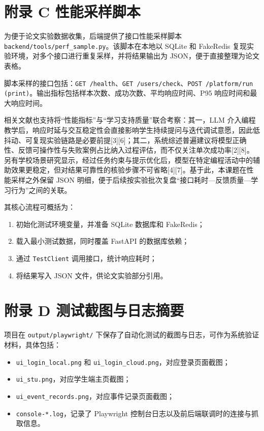 \section{附录 C 性能采样脚本}\label{ux9644ux5f55-c-ux6027ux80fdux91c7ux6837ux811aux672c}

为便于论文实验数据收集，后端提供了接口性能采样脚本 \texttt{backend/tools/perf\_sample.py}。该脚本在本地以 SQLite 和 FakeRedis 复现实验环境，对多个接口进行重复采样，并将结果输出为 JSON，便于直接整理为论文表格。

脚本采样的接口包括：\texttt{GET /health}、\texttt{GET /users/check}、\texttt{POST /platform/run (print)}。输出指标包括样本次数、成功次数、平均响应时间、P95 响应时间和最大响应时间。

相关文献也支持将“性能指标”与“学习支持质量”联合考察：其一，LLM 介入编程教学后，响应时延与交互稳定性会直接影响学生持续提问与迭代调试意愿，因此低抖动、可复现实验链路是必要前提{[}3{]}{[}6{]}；其二，系统综述普遍建议将模型正确性、反馈可操作性与失败案例占比纳入过程评估，而不仅关注单次成功率{[}2{]}{[}8{]}。另有学校场景研究显示，经过任务约束与提示优化后，模型在特定编程活动中的辅助效果更稳定，但对结果可靠性的核验步骤不可省略{[}4{]}{[}7{]}。基于此，本课题在性能采样之外保留 JSON 明细，便于后续按实验批次复盘“接口耗时—反馈质量—学习行为”之间的关联。

其核心流程可概括为：

\begin{enumerate}
  \item 初始化测试环境变量，并准备 SQLite 数据库和 FakeRedis；
  \item 载入最小测试数据，同时覆盖 FastAPI 的数据库依赖；
  \item 通过 \texttt{TestClient} 调用接口，统计响应耗时；
  \item 将结果写入 JSON 文件，供论文实验部分引用。
\end{enumerate}

\section{附录 D 测试截图与日志摘要}\label{ux9644ux5f55-d-ux6d4bux8bd5ux622aux56feux4e0eux65e5ux5fd7ux6458ux8981}

项目在 \texttt{output/playwright/} 下保存了自动化测试的截图与日志，可作为系统验证材料，具体包括：

\begin{itemize}
  \item \texttt{ui\_login\_local.png} 和 \texttt{ui\_login\_cloud.png}，对应登录页面截图；
  \item \texttt{ui\_stu.png}，对应学生端主页截图；
  \item \texttt{ui\_event\_records.png}，对应事件记录页面截图；
  \item \texttt{console-*.log}，记录了 Playwright 控制台日志以及前后端联调时的连接与抓取信息。
\end{itemize}

